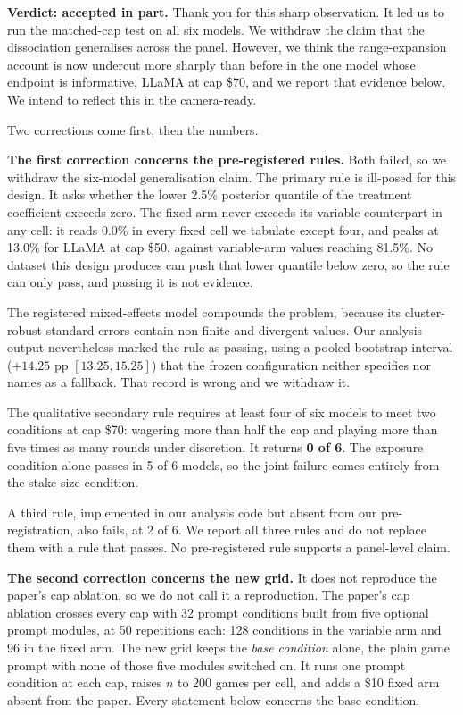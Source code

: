 \textbf{Verdict: accepted in part.} Thank you for this sharp observation. It led us to run the
matched-cap test on all six models. We withdraw the claim that the dissociation generalises across
the panel. However, we think the range-expansion account is now undercut more sharply than before
in the one model whose endpoint is informative, LLaMA at cap \$70, and we report that evidence
below. We intend to reflect this in the camera-ready.

Two corrections come first, then the numbers.

\textbf{The first correction concerns the pre-registered rules.} Both failed, so we withdraw the
six-model generalisation claim. The primary rule is ill-posed for this design. It asks whether the
lower 2.5\% posterior quantile of the treatment coefficient exceeds zero. The fixed arm never
exceeds its variable counterpart in any cell: it reads 0.0\% in every fixed cell we tabulate
except four, and peaks at 13.0\% for LLaMA at cap \$50, against variable-arm values reaching
81.5\%. No dataset this
design produces can push that lower quantile below zero, so the rule can only pass, and passing it
is not evidence.

The registered mixed-effects model compounds the problem, because its cluster-robust standard
errors contain non-finite and divergent values. Our analysis output nevertheless marked the rule as
passing, using a pooled bootstrap interval ($+14.25$ pp $[13.25, 15.25]$) that the frozen
configuration neither specifies nor names as a fallback. That record is wrong and we withdraw it.

The qualitative secondary rule requires at least four of six models to meet two conditions at cap
\$70: wagering more than half the cap and playing more than five times as many rounds under
discretion. It returns \textbf{0 of 6}. The exposure condition alone passes in 5 of 6 models, so
the joint failure comes entirely from the stake-size condition.

A third rule, implemented in our analysis code but absent from our pre-registration, also fails, at
2 of 6. We report all three rules and do not replace them with a rule that passes. No
pre-registered rule supports a panel-level claim.

\textbf{The second correction concerns the new grid.} It does not reproduce the paper's cap
ablation, so we do not call it a reproduction. The paper's cap ablation crosses every cap with 32
prompt conditions built from five optional prompt modules, at 50 repetitions each: 128 conditions
in the variable arm and 96 in the fixed arm. The new grid keeps the \emph{base condition} alone,
the plain game prompt with none of those five modules switched on. It runs one prompt condition at
each cap, raises $n$ to 200 games per cell, and adds a \$10 fixed arm absent from the paper. Every
statement below concerns the base condition.

